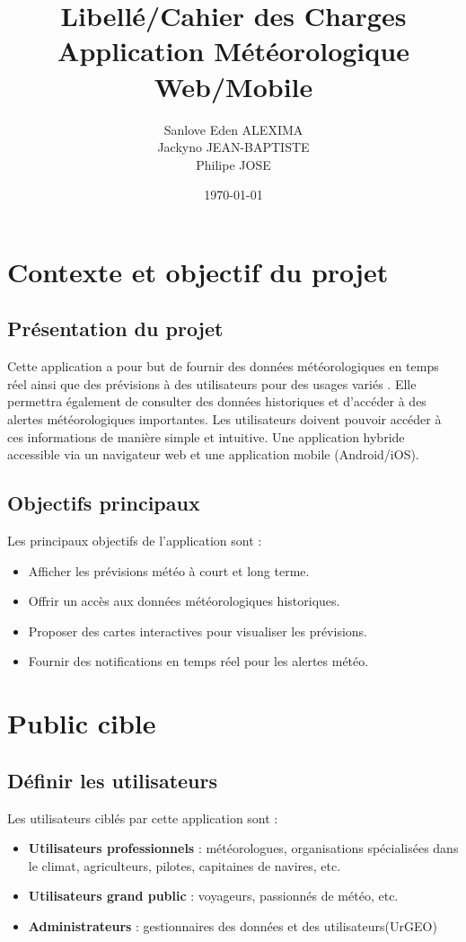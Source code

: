 \documentclass[a4paper,12pt]{article}
\title{Libellé/Cahier des Charges\\Application Météorologique Web/Mobile}
\author{Sanlove Eden ALEXIMA\\Jackyno JEAN-BAPTISTE\\{Philipe JOSE}\\}
\date{\today}
\begin{document}
\maketitle

\tableofcontents
\newpage

\section{Contexte et objectif du projet}
\subsection{Présentation du projet}
Cette application a pour but de fournir des données météorologiques en temps réel ainsi que des prévisions à des utilisateurs pour des usages variés . 
Elle permettra également de consulter des données historiques et d'accéder à des alertes météorologiques importantes. Les utilisateurs doivent pouvoir accéder à ces informations de manière simple et intuitive. Une application hybride accessible via un navigateur web et une application mobile (Android/iOS).

\subsection{Objectifs principaux}
Les principaux objectifs de l'application sont :
\begin{itemize}
    \item Afficher les prévisions météo à court et long terme.
    \item Offrir un accès aux données météorologiques historiques.
    \item Proposer des cartes interactives pour visualiser les prévisions.
    \item Fournir des notifications en temps réel pour les alertes météo.
\end{itemize}

\section{Public cible}
\subsection{Définir les utilisateurs}
Les utilisateurs ciblés par cette application sont :
\begin{itemize}
    \item \textbf{Utilisateurs professionnels} : météorologues, organisations spécialisées dans le climat, agriculteurs, pilotes, capitaines de navires, etc.
    \item \textbf{Utilisateurs grand public} : voyageurs, passionnés de météo, etc.
    \item \textbf{Administrateurs} : gestionnaires des données et des utilisateurs(UrGEO)
\end{itemize}
\end{document}
